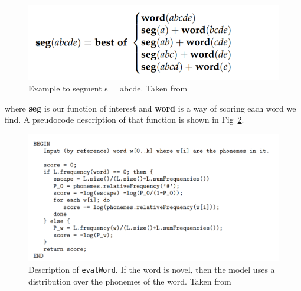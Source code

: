 \documentclass{article}
\begin{document}
\begin{figure}[h]
    \centering
    \includegraphics[scale=0.8]{figures/venkataram_seg_example.PNG}
    \caption{Example to segment s = abcde. Taken from \citet{Venkataraman}}
    \label{fig:fig7}
\end{figure}

where \textbf{seg} is our function of interest and \textbf{word} is a way of scoring each word we find. A pseudocode description of that function is shown in Fig~\ref{fig:fig8}.

\begin{figure}[h!]
    \centering
    \includegraphics[scale=0.8]{figures/venkataram_evalword.PNG}
    \caption{Description of \texttt{evalWord}. If the word is novel, then the model uses a distribution over the phonemes of the word. Taken from \citet{Venkataraman}}
    \label{fig:fig8}
\end{figure}
\end{document}
